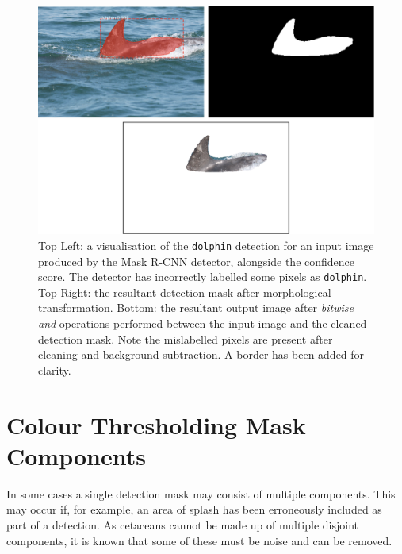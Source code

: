 \begin{figure}
	\begin{center}
		\includegraphics[scale=0.5]{Chapter5/figs/fin-extraction-unclean-uncropped.png}
	\end{center}
	\caption[Top Left: a visualisation of the \texttt{dolphin} detection for an input image produced by the Mask R-CNN detector, alongside the confidence score. Top Right: the resultant detection mask after morphological transformation. Bottom: the resultant output image after \textit{bitwise and} operations performed between the input image and the cleaned detection mask.]{Top Left: a visualisation of the \texttt{dolphin} detection for an input image produced by the Mask R-CNN detector, alongside the confidence score. The detector has incorrectly labelled some pixels as \texttt{dolphin}. Top Right: the resultant detection mask after morphological transformation. Bottom: the resultant output image after \textit{bitwise and} operations performed between the input image and the cleaned detection mask. Note the mislabelled pixels are present after cleaning and background subtraction. A border has been added for clarity.}
	\label{fig:fin-extraction-unclean}
\end{figure}

\section{Colour Thresholding Mask Components}\label{ch:postProcessing,sec:colourThresholdingMaskComponents}

In some cases a single detection mask may consist of multiple components. This may occur if, for example, an area of splash has been erroneously included as part of a detection. As cetaceans cannot be made up of multiple disjoint components, it is known that some of these must be noise and can be removed. 

